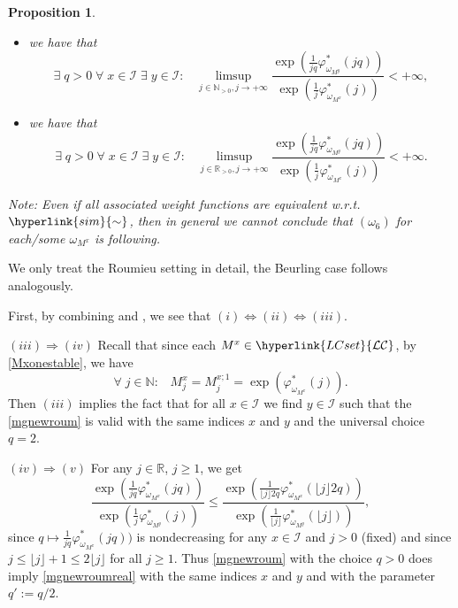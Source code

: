 \documentclass[10pt]{amsart}%
\numberwithin{equation}{section}
\theoremstyle{plain}
\newtheorem{proposition}{Proposition}[section]
\newcommand{\RR}{\mathbb{R}}
\newcommand{\NN}{\mathbb{N}}
\begin{document}
\begin{proposition}
\begin{itemize}
\item[$(iv)$] we have that
\begin{equation*}%
 \exists\;q>0\;\forall\;x\in\mathcal{I}\;\exists\;y\in\mathcal{I}:\;\;\;\limsup_{j\in\NN_{>0},j\rightarrow+\infty}\frac{\exp(\frac{1}{jq}\varphi^{*}_{\omega_{M^y}}(jq))}{\exp(\frac{1}{j}\varphi^{*}_{\omega_{M^x}}(j))}<+\infty,
\end{equation*}

 \item[$(v)$] we have that
 \begin{equation*}%
 \exists\;q>0\;\forall\;x\in\mathcal{I}\;\exists\;y\in\mathcal{I}:\;\;\;\limsup_{j\in\RR_{>0},j\rightarrow+\infty}\frac{\exp(\frac{1}{jq}\varphi^{*}_{\omega_{M^y}}(jq))}{\exp(\frac{1}{j}\varphi^{*}_{\omega_{M^x}}(j))}<+\infty.
 \end{equation*}

\end{itemize}
Note: Even if all associated weight functions are equivalent w.r.t. $\hyperlink{sim}{\sim}$, then in general we cannot conclude that \hyperlink{om6}{$(\omega_6)$} for each/some $\omega_{M^x}$ is following.
\end{proposition}

We only treat the Roumieu setting in detail, the Beurling case follows analogously.\vspace{6pt}

First, by combining \cite[Prop. 3.6]{testfunctioncharacterization} and \cite[Thm. 9.5.2, Thm. 9.5.3]{dissertation}, we see that $(i)\Leftrightarrow (ii) \Leftrightarrow (iii)$.\vspace{6pt}

$(iii)\Rightarrow(iv)$ Recall that since each $M^x\in\hyperlink{LCset}{\mathcal{LC}}$, by \eqref{Mxonestable}, we have
$$\forall\;j\in\NN:\;\;\;M^x_j=M^{x;1}_j=\exp(\varphi^{*}_{\omega_{M^x}}(j)).$$
Then $(iii)$ implies the fact that for all $x\in\mathcal{I}$ we find $y\in\mathcal{I}$ such that the \eqref{mgnewroum} is valid with the same indices $x$ and $y$ and the universal choice $q=2$.\vspace{6pt}

$(iv)\Rightarrow(v)$ For any $j\in\RR$, $j\ge 1$, we get $$\frac{\exp(\frac{1}{jq}\varphi^{*}_{\omega_{M^x}}(jq))}{\exp(\frac{1}{j}\varphi^{*}_{\omega_{M^y}}(j))}\le\frac{\exp(\frac{1}{\lfloor j\rfloor 2q}\varphi^{*}_{\omega_{M^x}}(\lfloor j\rfloor 2q))}{\exp(\frac{1}{\lfloor j\rfloor}\varphi^{*}_{\omega_{M^y}}(\lfloor j\rfloor))},$$
since $q\mapsto\frac{1}{jq}\varphi^{*}_{\omega_{M^x}}(jq))$ is nondecreasing for any $x\in\mathcal{I}$ and $j>0$ (fixed) and since $j\le \lfloor j\rfloor+1\le 2\lfloor j\rfloor$ for all $j\ge 1$. Thus \eqref{mgnewroum} with the choice $q>0$ does imply \eqref{mgnewroumreal} with the same indices $x$ and $y$ and with the parameter $q':=q/2$.\vspace{6pt}
\end{document}
